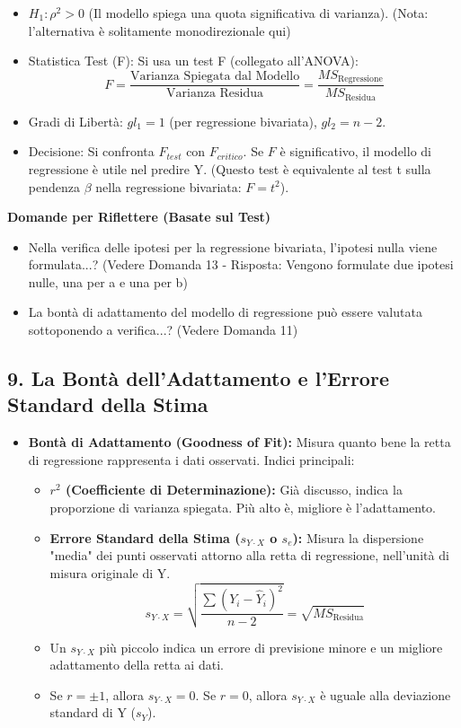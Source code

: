 \documentclass[12pt, a4paper]{article}
\newenvironment{reflectionbox}{%
    \medskip
    \begin{framed}\par\noindent
    \textbf{\color{boxtitlecolor}Domande per Riflettere (Basate sul Test)} \par
    \begin{itemize}[leftmargin=*, label=$\blacktriangleright$]
}{%
    \end{itemize}\par
    \end{framed}
    \medskip
}
\newcommand{\Halt}{H_1} %
\newcommand{\df}{gl} %
\newcommand{\poprho}{\rho} %
\newcommand{\rsq}{r^2} %
\newcommand{\Yhat}{\hat{Y}} %
\newcommand{\ErrStdEst}{s_{Y \cdot X}} %
\begin{document}
\begin{itemize}
\begin{itemize}
            \item $\Halt: \poprho^2 > 0$ (Il modello spiega una quota significativa di varianza). (Nota: l'alternativa è solitamente monodirezionale qui)
            \item Statistica Test (F): Si usa un test F (collegato all'ANOVA):
              $$ F = \frac{\text{Varianza Spiegata dal Modello}}{\text{Varianza Residua}} = \frac{MS_{\text{Regressione}}}{MS_{\text{Residua}}} $$
            \item Gradi di Libertà: $\df_1 = 1$ (per regressione bivariata), $\df_2 = n - 2$.
            \item Decisione: Si confronta $F_{test}$ con $F_{critico}$. Se $F$ è significativo, il modello di regressione è utile nel predire Y. (Questo test è equivalente al test t sulla pendenza $\beta$ nella regressione bivariata: $F = t^2$).
        \end{itemize}
\end{itemize}

\begin{reflectionbox}
    \item Nella verifica delle ipotesi per la regressione bivariata, l'ipotesi nulla viene formulata...? (Vedere Domanda 13 - Risposta: Vengono formulate due ipotesi nulle, una per a e una per b)
    \item La bontà di adattamento del modello di regressione può essere valutata sottoponendo a verifica...? (Vedere Domanda 11)
\end{reflectionbox}

\subsection*{9. La Bontà dell'Adattamento e l'Errore Standard della Stima}
\begin{itemize}
    \item \textbf{Bontà di Adattamento (Goodness of Fit):} Misura quanto bene la retta di regressione rappresenta i dati osservati. Indici principali:
        \begin{itemize}
            \item \textbf{$\rsq$ (Coefficiente di Determinazione):} Già discusso, indica la proporzione di varianza spiegata. Più alto è, migliore è l'adattamento.
            \item \textbf{Errore Standard della Stima ($\ErrStdEst$ o $s_{e}$):} Misura la dispersione "media" dei punti osservati attorno alla retta di regressione, nell'unità di misura originale di Y.
              $$ \ErrStdEst = \sqrt{\frac{\sum (Y_i - \Yhat_i)^2}{n-2}} = \sqrt{MS_{\text{Residua}}} $$
            \item Un $\ErrStdEst$ più piccolo indica un errore di previsione minore e un migliore adattamento della retta ai dati.
            \item Se $r = \pm 1$, allora $\ErrStdEst = 0$. Se $r = 0$, allora $\ErrStdEst$ è uguale alla deviazione standard di Y ($s_Y$).
        \end{itemize}
\end{itemize}
\end{document}
